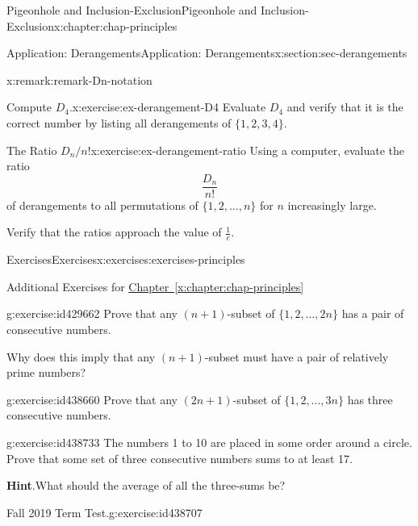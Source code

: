 \documentclass[oneside,10pt,]{book}
\newcommand{\blocktitlefont}{\relax}
\newcommand{\xreffont}{\relax}
\numberwithin{equation}{section}
\begin{document}
\begin{chapterptx}{Pigeonhole and Inclusion-Exclusion}{}{Pigeonhole and Inclusion-Exclusion}{}{}{x:chapter:chap-principles}
\begin{sectionptx}{Application: Derangements}{}{Application: Derangements}{}{}{x:section:sec-derangements}
\begin{remark}{}{x:remark:remark-Dn-notation}
\end{remark}
\begin{inlineexercise}{Compute \(D_4\).}{x:exercise:ex-derangement-D4}%
Evaluate \(D_4\) and verify that it is the correct number by listing all derangements of \(\{1,2,3,4\}\).%
\end{inlineexercise}
\begin{inlineexercise}{The Ratio \(D_n/n!\)}{x:exercise:ex-derangement-ratio}%
Using a computer, evaluate the ratio%
\begin{equation*}
\frac{D_n}{n!}
\end{equation*}
of derangements to all permutations of \(\{1,2,\ldots,n\}\) for \(n\) increasingly large.%
\par
Verify that the ratios approach the value of \(\frac{1}{e}\).%
\end{inlineexercise}
\end{sectionptx}
%
%
\typeout{************************************************}
\typeout{************************************************}
%
\begin{exercises-section}{Exercises}{}{Exercises}{}{}{x:exercises:exercises-principles}
\begin{introduction}{}%
Additional Exercises for \hyperref[x:chapter:chap-principles]{Chapter~{\xreffont\ref{x:chapter:chap-principles}}}%
\end{introduction}%
\begin{divisionexercise}{1}{}{}{g:exercise:id429662}%
Prove that any \((n+1)\)-subset of \(\{1,2,\ldots,2n\}\) has a pair of consecutive numbers.%
\par
Why does this imply that any \((n+1)\)-subset must have a pair of relatively prime numbers?%
\end{divisionexercise}%
\begin{divisionexercise}{2}{}{}{g:exercise:id438660}%
Prove that any \((2n+1)\)-subset of \(\{1,2,\ldots,3n\}\) has three consecutive numbers.%
\end{divisionexercise}%
\begin{divisionexercise}{3}{}{}{g:exercise:id438733}%
The numbers 1 to 10 are placed in some order around a circle. Prove that some set of three consecutive numbers sums to at least 17.%
\par\smallskip%
\noindent\textbf{\blocktitlefont Hint}.\hypertarget{g:hint:id438724}{}\quad{}What should the average of all the three-sums be?%
\end{divisionexercise}%
\begin{divisionexercise}{4}{Fall 2019 Term Test.}{}{g:exercise:id438707}%

\end{divisionexercise}
\end{exercises-section}
\end{chapterptx}
\end{document}
